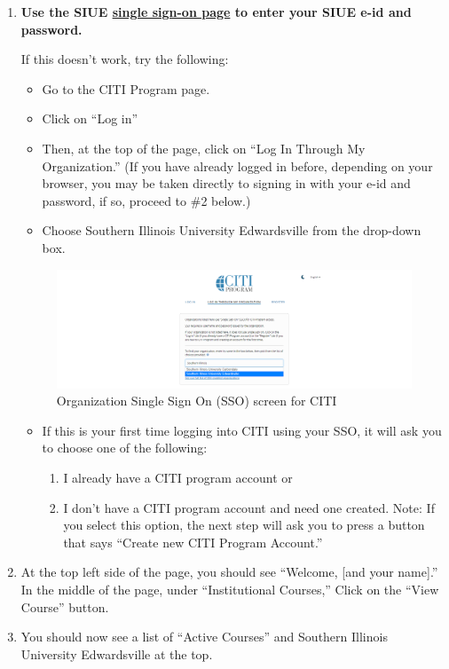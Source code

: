 \documentclass[
]{book}
\begin{document}
\begin{enumerate}
\def\labelenumi{\arabic{enumi}.}
\item
  \textbf{Use the SIUE \href{https://www.citiprogram.org/Shibboleth.sso/Login?target=https\%3A\%2F\%2Fwww.citiprogram.org\%2FSecure\%2FWelcome.cfm?inst=551&entityID=https\%3A\%2F\%2Fsts.windows.net\%2F99f37d21-0b5c-43ea-9103-e16f02f5aecf\%2F}{single sign-on page} to enter your SIUE e-id and password.}

  If this doesn't work, try the following:

  \begin{itemize}
  \item
    Go to the CITI Program page.
  \item
    Click on ``Log in''
  \item
    Then, at the top of the page, click on ``Log In Through My Organization.'' (If you have already logged in before, depending on your browser, you may be taken directly to signing in with your e-id and password, if so, proceed to \#2 below.)
  \item
    Choose Southern Illinois University Edwardsville from the drop-down box.
  \end{itemize}

  \begin{figure}
  \centering
  \includegraphics[width=1\linewidth,height=\textheight,keepaspectratio]{images/citi-org-login.png}
  \caption{Organization Single Sign On (SSO) screen for CITI}
  \end{figure}

  \begin{itemize}
  \item
    If this is your first time logging into CITI using your SSO, it will ask you to choose one of the following:

    \begin{enumerate}
    \def\labelenumii{\arabic{enumii}.}
    \item
      I already have a CITI program account or
    \item
      I don't have a CITI program account and need one created. Note: If you select this option, the next step will ask you to press a button that says ``Create new CITI Program Account.''
    \end{enumerate}
  \end{itemize}
\item
  At the top left side of the page, you should see ``Welcome, {[}and your name{]}.'' In the middle of the page, under ``Institutional Courses,'' Click on the ``View Course'' button.
\item
  You should now see a list of ``Active Courses'' and Southern Illinois University Edwardsville at the top.
\end{enumerate}
\end{document}
